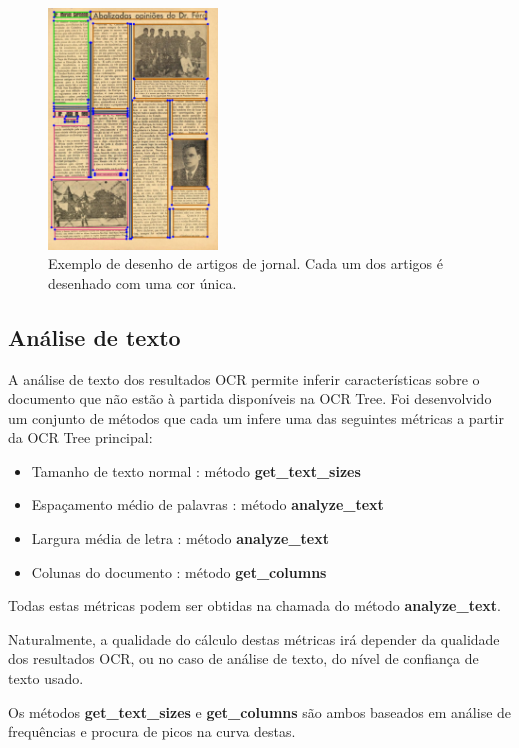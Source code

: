\begin{figure}[H]
	\centering
	\includegraphics[width=0.4\textwidth]{images/ilustracoes/draw_articles.png}
	\caption{Exemplo de desenho de artigos de jornal. Cada um dos artigos é desenhado com uma cor única.}
	\label{fig:draw_articles}
\end{figure}


\subsection{Análise de texto}
\label{contribution_text_analyses}

A análise de texto dos resultados OCR permite inferir características sobre o documento que não estão à partida disponíveis na OCR Tree. Foi desenvolvido um conjunto de métodos que cada um infere uma das seguintes métricas a partir da OCR Tree principal:

\begin{itemize}
	\item Tamanho de texto normal : método \textbf{get\_text\_sizes}
	\item Espaçamento médio de palavras : método \textbf{analyze\_text}
	\item Largura média de letra : método \textbf{analyze\_text}
	\item Colunas do documento : método \textbf{get\_columns}
\end{itemize}

Todas estas métricas podem ser obtidas na chamada do método \textbf{analyze\_text}.

Naturalmente, a qualidade do cálculo destas métricas irá depender da qualidade dos resultados OCR, ou no caso de análise de texto, do nível de confiança de texto usado.

Os métodos \textbf{get\_text\_sizes} e \textbf{get\_columns} são ambos baseados em análise de frequências e procura de picos na curva destas.


